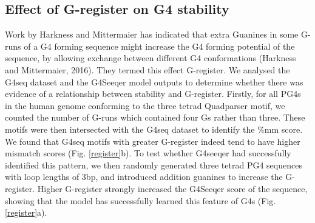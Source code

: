 \documentclass[12pt,a4paper,]{report}
\begin{document}
\newpage

\hypertarget{effect-of-g-register-on-g4-stability}{%
\subsection{Effect of G-register on G4
stability}\label{effect-of-g-register-on-g4-stability}}

Work by Harkness and Mittermaier has indicated that extra Guanines in
some G-runs of a G4 forming sequence might increase the G4 forming
potential of the sequence, by allowing exchange between different G4
conformations (Harkness and Mittermaier, 2016). They termed this effect
G-register. We analysed the G4seq dataset and the G4Seeqer model outputs
to determine whether there was evidence of a relationship between
stability and G-register. Firstly, for all PG4s in the human genome
conforming to the three tetrad Quadparser motif, we counted the number
of G-runs which contained four Gs rather than three. These motifs were
then intersected with the G4seq dataset to identify the \%mm score. We
found that G4seq motifs with greater G-register indeed tend to have
higher mismatch scores (Fig. \ref{register}b). To test whether G4seeqer
had successfully identified this pattern, we then randomly generated
three tetrad PG4 sequences with loop lengths of 3bp, and introduced
addition guanines to increase the G-register. Higher G-register strongly
increased the G4Seeqer score of the sequence, showing that the model has
successfully learned this feature of G4s (Fig. \ref{register}a).

\newpage
\end{document}
